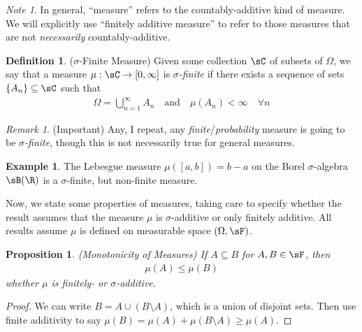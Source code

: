 \documentclass[12pt]{article}
\theoremstyle{plain}
\newtheorem{prop}[thm]{Proposition}
\theoremstyle{definition}
\newtheorem{defn}[thm]{Definition}
\newtheorem{ex}[thm]{Example}
\theoremstyle{remark}
\newtheorem*{rmk}{Remark}
\newtheorem*{note}{Note}
\newcommand{\ra}{\rightarrow}
\newcommand{\ninf}{_{n=1}^\infty}
\begin{document}
\begin{note}
In general, ``measure'' refers to the countably-additive kind of
measure. We will explicitly use ``finitely additive measure'' to refer
to those measures that are not \emph{necessarily} countably-additive.
\end{note}

\begin{defn}($\sigma$-Finite Measure)
Given some collection $\sC$ of subsets of $\Omega$,
we say that a measure $\mu:\sC\ra [0,\infty]$
is \emph{$\sigma$-finite} if there exists a sequence of sets
$\{A_n\}\subseteq \sC$ such that
\begin{align*}
  \Omega = \bigcup\ninf A_n
  \quad \text{and}\quad
  \mu(A_n)<\infty
  \quad\forall n
\end{align*}
\end{defn}

\begin{rmk}(Important)
Any, I repeat, any \emph{finite}/\emph{probability} measure is going to
be \emph{$\sigma$-finite}, though this is not necessarily true for
general measures.
\end{rmk}

\begin{ex}
The Lebesgue measure $\mu([a,b])=b-a$ on the Borel $\sigma$-algebra
$\sB(\R)$ is a $\sigma$-finite, but non-finite measure.
\end{ex}


Now, we state some properties of measures, taking care to specify
whether the result assumes that the measure $\mu$ is $\sigma$-additive
or only finitely additive. All results assume $\mu$ is defined on
measurable space $(\Omega,\sF)$.

\begin{prop}\emph{(Monotonicity of Measures)}
If $A\subseteq B$ for $A,B\in\sF$, then
\begin{align*}
  \mu(A) \leq \mu(B)
\end{align*}
whether $\mu$ is finitely- or $\sigma$-additive.
\end{prop}
\begin{proof}
We can write $B = A \cup (B\setminus A)$, which is a union of disjoint
sets. Then use finite additivity to say $\mu(B) = \mu(A) +
\mu(B\setminus A) \geq \mu(A)$.
\end{proof}
\end{document}

